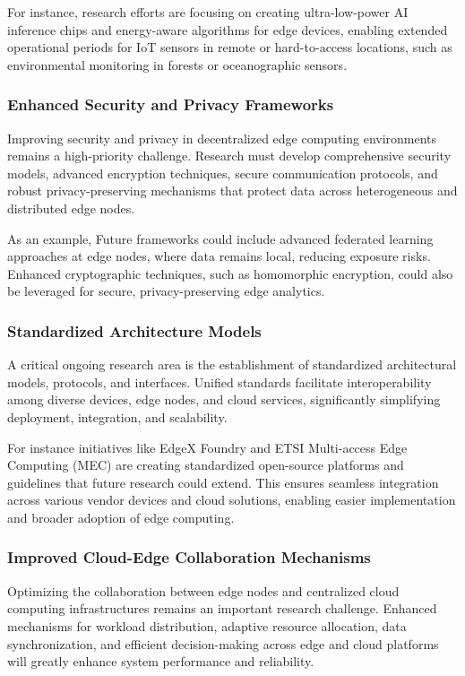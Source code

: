 \documentclass[runningheads]{llncs}
\begin{document}
\noindent For instance, research efforts are focusing on creating ultra-low-power AI inference chips and energy-aware algorithms for edge devices, enabling extended operational periods for IoT sensors in remote or hard-to-access locations, such as environmental monitoring in forests or oceanographic sensors.

\subsubsection{Enhanced Security and Privacy Frameworks}
Improving security and privacy in decentralized edge computing environments remains a high-priority challenge. Research must develop comprehensive security models, advanced encryption techniques, secure communication protocols, and robust privacy-preserving mechanisms that protect data across heterogeneous and distributed edge nodes.

\noindent As an example, Future frameworks could include advanced federated learning approaches at edge nodes, where data remains local, reducing exposure risks. Enhanced cryptographic techniques, such as homomorphic encryption, could also be leveraged for secure, privacy-preserving edge analytics.

\subsubsection{Standardized Architecture Models}
A critical ongoing research area is the establishment of standardized architectural models, protocols, and interfaces. Unified standards facilitate interoperability among diverse devices, edge nodes, and cloud services, significantly simplifying deployment, integration, and scalability.

\noindent For instance initiatives like EdgeX Foundry and ETSI Multi-access Edge Computing (MEC) are creating standardized open-source platforms and guidelines that future research could extend. This ensures seamless integration across various vendor devices and cloud solutions, enabling easier implementation and broader adoption of edge computing.

\subsubsection{Improved Cloud-Edge Collaboration Mechanisms}
Optimizing the collaboration between edge nodes and centralized cloud computing infrastructures remains an important research challenge. Enhanced mechanisms for workload distribution, adaptive resource allocation, data synchronization, and efficient decision-making across edge and cloud platforms will greatly enhance system performance and reliability.
\end{document}
